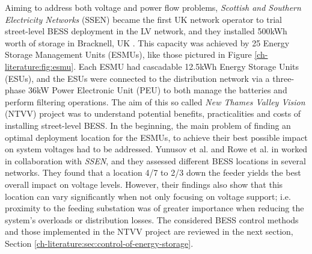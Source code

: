 

Aiming to address both voltage and power flow problems, \textit{Scottish and Southern Electricity Networks} (SSEN) became the first UK network operator to trial street-level BESS deployment in the LV network, and they installed 500kWh worth of storage in Bracknell, UK \cite{SSEN2016}.
This capacity was achieved by 25 Energy Storage Management Units (ESMUs), like those pictured in Figure \ref{ch-literature:fig:esmu}.
Each ESMU had cascadable 12.5kWh Energy Storage Units (ESUs), and the ESUs were connected to the distribution network via a three-phase 36kW Power Electronic Unit (PEU) to both manage the batteries and perform filtering operations.
The aim of this so called \textit{New Thames Valley Vision} (NTVV) project was to understand potential benefits, practicalities and costs of installing street-level BESS.
In the beginning, the main problem of finding an optimal deployment location for the ESMUs, to achieve their best possible impact on system voltages had to be addressed.
Yunusov et al. and Rowe et al. in \cite{Yunusov2016, Rowe2014, Rowe2014a} worked in collaboration with \textit{SSEN}, and they assessed different BESS locations in several networks.
They found that a location 4/7 to 2/3 down the feeder yields the best overall impact on voltage levels.
However, their findings also show that this location can vary significantly when not only focusing on voltage support; i.e. proximity to the feeding substation was of greater importance when reducing the system's overloads or distribution losses.
The considered BESS control methods and those implemented in the NTVV project are reviewed in the next section, Section \ref{ch-literature:sec:control-of-energy-storage}.








